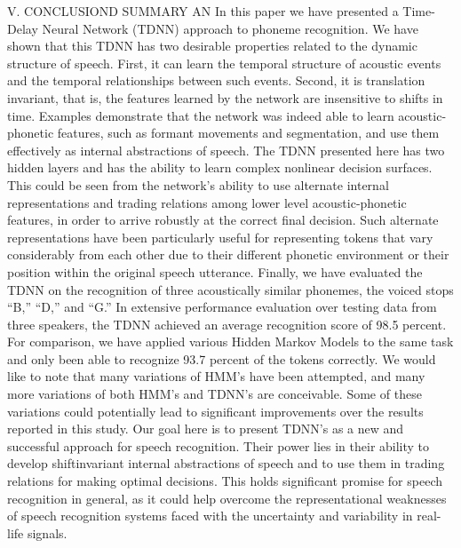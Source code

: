 V. CONCLUSIOND SUMMARY AN
In this paper we have presented a Time-Delay Neural Network (TDNN) approach to phoneme recognition. 
We have shown that this TDNN has two desirable properties related to the dynamic structure of speech. 
First, it can learn the temporal structure of acoustic events and the temporal relationships between such events. 
Second, it is translation invariant, that is, the features learned by the network are insensitive to shifts in time. 
Examples demonstrate that the network was indeed able to learn acoustic-phonetic features, such as formant movements and segmentation, and use them effectively as internal abstractions of speech.
The TDNN presented here has two hidden layers and has the ability to learn complex nonlinear decision surfaces. 
This could be seen from the network’s ability to use alternate internal representations and trading relations among lower level acoustic-phonetic features, in order to arrive robustly at the correct final decision.
Such alternate representations have been particularly useful for representing tokens that vary considerably from each other due to their different phonetic environment or their position within the original speech utterance.
Finally, we have evaluated the TDNN on the recognition of three acoustically similar phonemes, the voiced stops “B,” “D,” and “G.” 
In extensive performance evaluation over testing data from three speakers, the TDNN achieved an average recognition score of 98.5 percent. 
For comparison, we have applied various Hidden Markov Models to the same task and only been able to recognize 93.7 percent of the tokens correctly. 
We would like to note that many variations of HMM’s have been attempted, and many more variations of both HMM’s and TDNN’s are conceivable. 
Some of these variations could potentially lead to significant improvements over the results reported in this study. 
Our goal here is to present TDNN’s as a new and successful approach for speech recognition. 
Their power lies in their ability to develop shiftinvariant internal abstractions of speech and to use them in trading relations for making optimal decisions. 
This holds significant promise for speech recognition in general, as it could help overcome the representational weaknesses of speech recognition systems faced with the uncertainty and variability in real-life signals.
